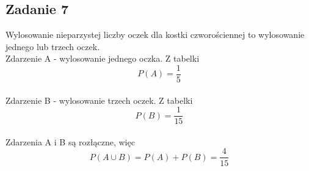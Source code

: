 \subsection{Zadanie 7}

Wylosowanie nieparzystej liczby oczek dla kostki czworościennej to wylosowanie jednego lub trzech oczek. \\
Zdarzenie A - wylosowanie jednego oczka. Z tabelki 
\[ P(A)=\frac{1}{5} \] \\
Zdarzenie B - wylosowanie trzech oczek. Z tabelki 
\[ P(B)=\frac{1}{15} \] \\
Zdarzenia A i B są rozłączne, więc
 \[ P(A{\cup}B) = P(A) + P(B) = \frac{4}{15} \] \\

